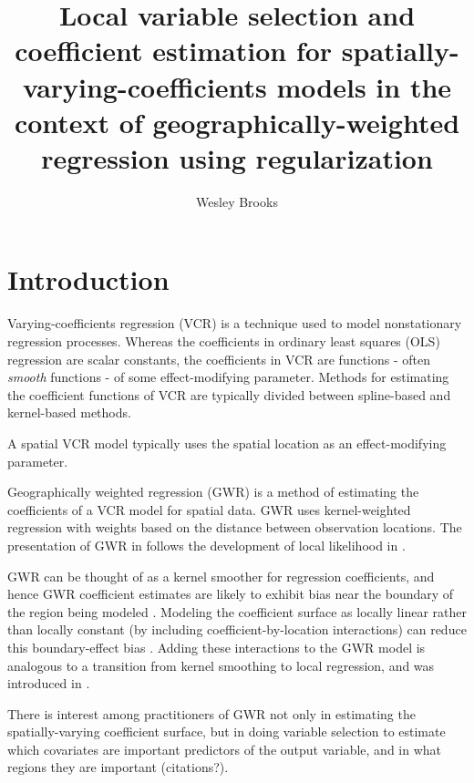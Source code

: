 \documentclass[authoryear, review, 11pt]{elsarticle}
\title{Local variable selection and coefficient estimation for spatially-varying-coefficients models in the context of geographically-weighted regression using regularization}
\author{Wesley Brooks}
\date{}                                           %
\begin{document}
\maketitle





\section{Introduction}
	Varying-coefficients regression (VCR) \citep{Hastie:1993a} is a technique used to model nonstationary regression processes. Whereas the coefficients in ordinary least squares (OLS) regression are scalar constants, the coefficients in VCR are functions - often \emph{smooth} functions - of some effect-modifying parameter.  Methods for estimating the coefficient functions of VCR are typically divided between spline-based \citep{Wood:2006} and kernel-based \citep{Hastie:1993b, Loader:1999} methods. 
	
	A spatial VCR model typically uses the spatial location as an effect-modifying parameter. 
	
	Geographically weighted regression (GWR) \citep{Fotheringham:2002} is a method of estimating the coefficients of a VCR model for spatial data. GWR uses kernel-weighted regression with weights based on the distance between observation locations. The presentation of GWR in \cite{Fotheringham:2002} follows the development of local likelihood in \cite{Loader:1999}.
	
	GWR can be thought of as a kernel smoother for regression coefficients, and hence GWR coefficient estimates are likely to exhibit bias near the boundary of the region being modeled \citep{Hastie:1993b}. Modeling the coefficient surface as locally linear rather than locally constant (by including coefficient-by-location interactions) can reduce this boundary-effect bias \citep{Hastie:1993b}. Adding these interactions to the GWR model is analogous to a transition from kernel smoothing to local regression, and was introduced in \cite{Wang:2008b}.
	
	There is interest among practitioners of GWR not only in estimating the spatially-varying coefficient surface, but in doing variable selection to estimate which covariates are important predictors of the output variable, and in what regions they are important (citations?).
	
\end{document}
